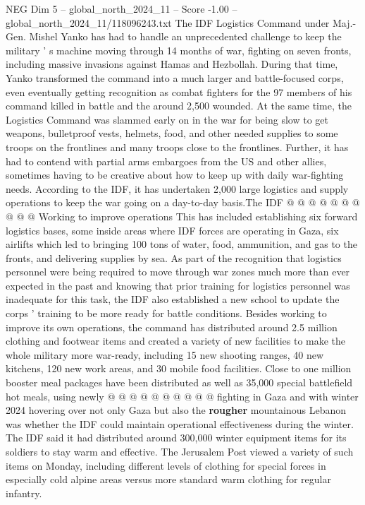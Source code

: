 \begin{textsample}{NEG Dim 5 – global\_north\_2024\_11 – Score -1.00 – global\_north\_2024\_11/118096243.txt}  \label{ex:f5_neg_425}
The IDF Logistics Command under Maj.-Gen.
Mishel Yanko has had to handle an unprecedented challenge to keep the military ' s machine moving through 14 months of war, fighting on seven fronts, including massive invasions against Hamas and Hezbollah.
During that time, Yanko transformed the command into a much larger and battle-focused corps, even eventually getting recognition as combat fighters for the 97 members of his command killed in battle and the around 2,500 wounded.
At the same time, the Logistics Command was slammed early on in the war for being slow to get weapons, bulletproof vests, helmets, food, and other needed supplies to some troops on the frontlines and many troops close to the frontlines.
Further, it has had to contend with partial arms embargoes from the US and other allies, sometimes having to be creative about how to keep up with daily war-fighting needs.
According to the IDF, it has undertaken 2,000 large logistics and supply operations to keep the war going on a day-to-day basis.The IDF @ @ @ @ @ @ @ @ @ @ Working to improve operations This has included establishing six forward logistics bases, some inside areas where IDF forces are operating in Gaza, six airlifts which led to bringing 100 tons of water, food, ammunition, and gas to the fronts, and delivering supplies by sea.
As part of the recognition that logistics personnel were being required to move through war zones much more than ever expected in the past and knowing that prior training for logistics personnel was inadequate for this task, the IDF also established a new school to update the corps ' training to be more ready for battle conditions.
Besides working to improve its own operations, the command has distributed around 2.5 million clothing and footwear items and created a variety of new facilities to make the whole military more war-ready, including 15 new shooting ranges, 40 new kitchens, 120 new work areas, and 30 mobile food facilities.
Close to one million booster meal packages have been distributed as well as 35,000 special battlefield hot meals, using newly @ @ @ @ @ @ @ @ @ @ fighting in Gaza and with winter 2024 hovering over not only Gaza but also the \textbf{rougher} mountainous Lebanon was whether the IDF could maintain operational effectiveness during the winter.
The IDF said it had distributed around 300,000 winter equipment items for its soldiers to stay warm and effective.
The Jerusalem Post viewed a variety of such items on Monday, including different levels of clothing for special forces in especially cold alpine areas versus more standard warm clothing for regular infantry.

\end{textsample}
